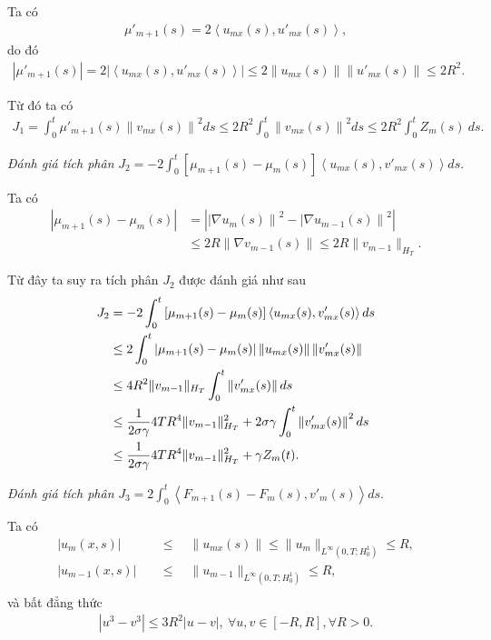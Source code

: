 \documentclass[12pt,a4paper]{article}
\theoremstyle{definition}
\theoremstyle{definition}
\begin{document}
Ta có
\begin{align*}
    \mu'_{m+1}(s) = 2\left<u_{mx}(s), u'_{mx}(s)\right>, 
\end{align*}
do đó
\begin{align*}
    |\mu'_{m+1}(s)| = 2\left|\left<u_{mx}(s), u'_{mx}(s)\right>\right| \le 2 \left\|u_{mx}(s)\right\|\left\|u'_{mx}(s)\right\| \le 2R^2.
\end{align*}

Từ đó ta có
\begin{align} \label{370}
    J_1 = \int_0^t \mu'_{m+1}(s)\left\|v_{mx}(s)\right\|^2 ds \le 2R^2 \int_0^t \left\|v_{mx}(s)\right\|^2 ds \le 2R^2 \int_0^t Z_m(s)\:ds.
\end{align}

\textit{Đánh giá tích phân} $\displaystyle J_2 = - 2 \int_0^t \left[\mu_{m+1}(s) - \mu_m(s)\right] \left<u_{mx}(s), v'_{mx}(s)\right> ds$.

Ta có
\begin{align*}
    \left|\mu_{m+1}(s) - \mu_m(s)\right|
    &= \left|\left|\nabla u_{m}(s)\right\|^2 - \left|\nabla u_{m-1}(s)\right\|^2\right| \\
    &\le 2R \left\|\nabla v_{m-1}(s)\right\|
    \le 2R \|v_{m-1}\|_{H_T}.
\end{align*}

Từ đây ta suy ra tích phân $J_2$ được đánh giá như sau
\begin{align}
    J_2
    &= -2 \int_0^t \left[\mu_{m+1}(s) - \mu_m(s)\right] \left<u_{mx}(s), v'_{mx}(s)\right> ds \\
    &\le 2 \int_0^t \left|\mu_{m+1}(s) - \mu_m(s)\right| \left\|u_{mx}(s)\right\| \left\|v'_{mx}(s)\right\| \notag \\
    &\le 4R^2 \|v_{m-1}\|_{H_T} \int_0^t \left\|v'_{mx}(s)\right\|ds \notag \\
    &\le \frac{1}{2\sigma \gamma} 4TR^4 \|v_{m-1}\|^2_{H_T} + 2 \sigma \gamma \int_0^t \left\|v'_{mx}(s)\right\|^2 ds \notag \\
    &\le \frac{1}{2\sigma \gamma} 4TR^4 \|v_{m-1}\|^2_{H_T} + \gamma Z_m(t). \notag
\end{align}

\textit{Đánh giá tích phân} $\displaystyle J_3 = 2 \int_0^t \left<F_{m+1}(s) - F_m(s), v'_m(s)\right> ds$.

Ta có
\begin{align*}
    |u_m(x,s)| \quad &\le \quad \|u_{mx}(s)\| \le \|u_m\|_{L^\infty(0,T;H^1_0)} \le R, \\
    |u_{m-1}(x,s)| \quad &\le \quad \|u_{m-1}\|_{L^\infty(0,T;H^1_0)} \le R, \\
\end{align*}
và bất đẳng thức
\begin{align*}
    |u^3 - v^3| \le 3R^2 |u - v|, \ \forall u,v \in [-R, R], \forall R > 0.
\end{align*}
\end{document}
